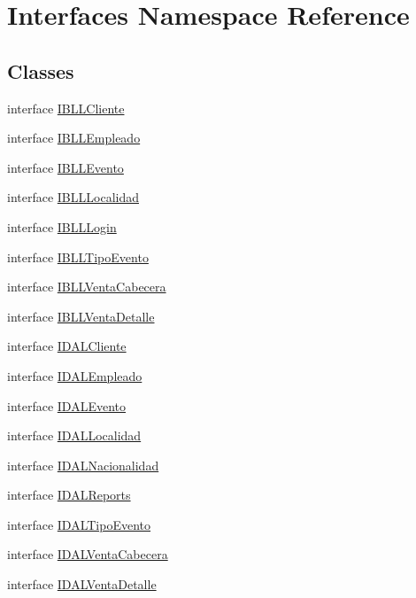 \hypertarget{namespace_interfaces}{}\section{Interfaces Namespace Reference}
\label{namespace_interfaces}
\subsection*{Classes}
\begin{DoxyCompactItemize}
\item 
interface \hyperlink{interface_interfaces_1_1_i_b_l_l_cliente}{I\+B\+L\+L\+Cliente}
\item 
interface \hyperlink{interface_interfaces_1_1_i_b_l_l_empleado}{I\+B\+L\+L\+Empleado}
\item 
interface \hyperlink{interface_interfaces_1_1_i_b_l_l_evento}{I\+B\+L\+L\+Evento}
\item 
interface \hyperlink{interface_interfaces_1_1_i_b_l_l_localidad}{I\+B\+L\+L\+Localidad}
\item 
interface \hyperlink{interface_interfaces_1_1_i_b_l_l_login}{I\+B\+L\+L\+Login}
\item 
interface \hyperlink{interface_interfaces_1_1_i_b_l_l_tipo_evento}{I\+B\+L\+L\+Tipo\+Evento}
\item 
interface \hyperlink{interface_interfaces_1_1_i_b_l_l_venta_cabecera}{I\+B\+L\+L\+Venta\+Cabecera}
\item 
interface \hyperlink{interface_interfaces_1_1_i_b_l_l_venta_detalle}{I\+B\+L\+L\+Venta\+Detalle}
\item 
interface \hyperlink{interface_interfaces_1_1_i_d_a_l_cliente}{I\+D\+A\+L\+Cliente}
\item 
interface \hyperlink{interface_interfaces_1_1_i_d_a_l_empleado}{I\+D\+A\+L\+Empleado}
\item 
interface \hyperlink{interface_interfaces_1_1_i_d_a_l_evento}{I\+D\+A\+L\+Evento}
\item 
interface \hyperlink{interface_interfaces_1_1_i_d_a_l_localidad}{I\+D\+A\+L\+Localidad}
\item 
interface \hyperlink{interface_interfaces_1_1_i_d_a_l_nacionalidad}{I\+D\+A\+L\+Nacionalidad}
\item 
interface \hyperlink{interface_interfaces_1_1_i_d_a_l_reports}{I\+D\+A\+L\+Reports}
\item 
interface \hyperlink{interface_interfaces_1_1_i_d_a_l_tipo_evento}{I\+D\+A\+L\+Tipo\+Evento}
\item 
interface \hyperlink{interface_interfaces_1_1_i_d_a_l_venta_cabecera}{I\+D\+A\+L\+Venta\+Cabecera}
\item 
interface \hyperlink{interface_interfaces_1_1_i_d_a_l_venta_detalle}{I\+D\+A\+L\+Venta\+Detalle}
\end{DoxyCompactItemize}
